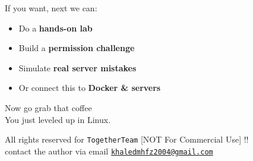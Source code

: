 \documentclass[12pt]{article}
\newcommand{\penguinicon}{\faLinux}
\newcommand{\coffeeicon}{\faCoffee}
\begin{document}
\begin{infobox}
If you want, next we can:
\begin{itemize}
    \item Do a \textbf{hands-on lab}
    \item Build a \textbf{permission challenge}
    \item Simulate \textbf{real server mistakes}
    \item Or connect this to \textbf{Docker \& servers}
\end{itemize}
\end{infobox}

Now go grab that coffee \coffeeicon\\
You just leveled up in Linux. \penguinicon\ \faFire

\vspace{\fill}
\begin{center}
\color{muted}
All rights reserved for \texttt{TogetherTeam} [NOT For Commercial Use] !!\\
contact the author via email \href{mailto:khaledmhfz2004@gmail.com}{\texttt{khaledmhfz2004@gmail.com}}
\end{center}
\end{document}
